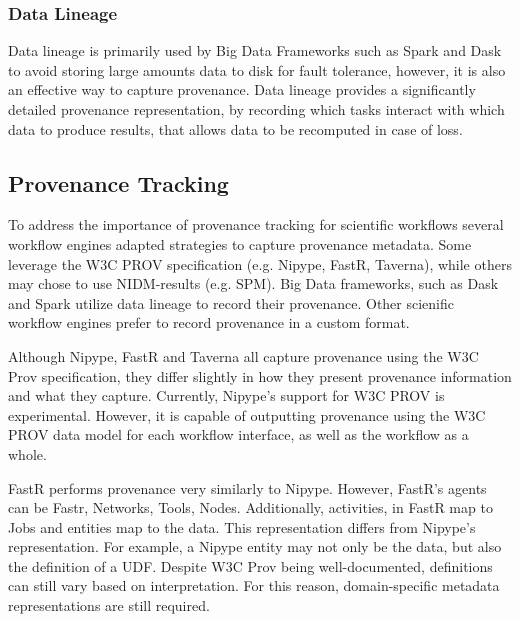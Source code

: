             \subsubsection{Data Lineage}
                Data lineage is primarily used by Big Data Frameworks such as 
                Spark and Dask to avoid storing large amounts data to disk for
                fault tolerance, however, it is also an effective way to capture
                provenance. Data lineage provides a significantly detailed 
                provenance representation, by recording which tasks interact with
                which data to produce results, that allows data to be recomputed 
                in case of loss. 

        \subsection{Provenance Tracking}\label{prov}

            To address the importance of provenance tracking for scientific 
            workflows several workflow engines adapted strategies to capture 
            provenance metadata. Some leverage the W3C PROV specification (e.g.
            Nipype, FastR, Taverna), while others may chose to use NIDM-results (e.g. 
            SPM). Big Data frameworks, such as Dask and Spark utilize data lineage
            to record their provenance. Other scienific workflow engines prefer 
            to record provenance in a custom format.

            Although Nipype, FastR and Taverna all capture provenance using 
            the W3C Prov specification, they differ slightly in how they
            present provenance
            information and what they capture.
            Currently, Nipype's support for W3C PROV is experimental. However,
            it is capable of outputting provenance using the W3C PROV data 
            model for each workflow interface, as well as the workflow as a 
            whole.
    
            FastR performs provenance very similarly to Nipype. However,
            FastR's agents can be Fastr, Networks, Tools, Nodes. Additionally,
            activities, in
            FastR map to Jobs and entities map to the data. This representation
            differs from Nipype's representation. For example, a Nipype entity
            may not only be the data, but also the definition of a UDF. Despite
            W3C Prov being well-documented, definitions can still vary based on 
            interpretation. For this reason, domain-specific metadata representations
            are still required.
    
